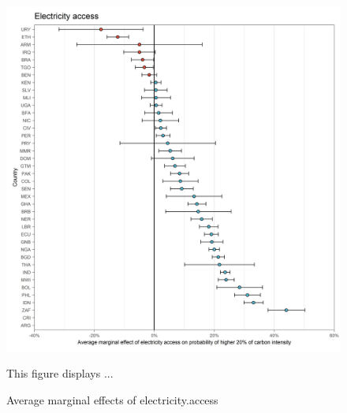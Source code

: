 \documentclass[12pt, a4paper]{article}
\newenvironment{subcaption}
{\strut
\vspace{-5pt}
\begin{minipage}[b]{0.9\textwidth}
  \hspace*{-\parindent}
  \footnotesize}
 {\end{minipage}}
\begin{document}
 \clearpage
%
 \begin{figure}[ht!]
   \centering
   \caption{Average marginal effects of electricity.access} \label{fig:F2_Electricity}
   \includegraphics{Analysis_Logit_Models_Marginal_Effects/Average_Marginal_Effects_affected_upper_80_electricity.access}
   \begin{subcaption}
     This figure displays ...
   \end{subcaption}
 \end{figure}

 \clearpage
\end{document}

